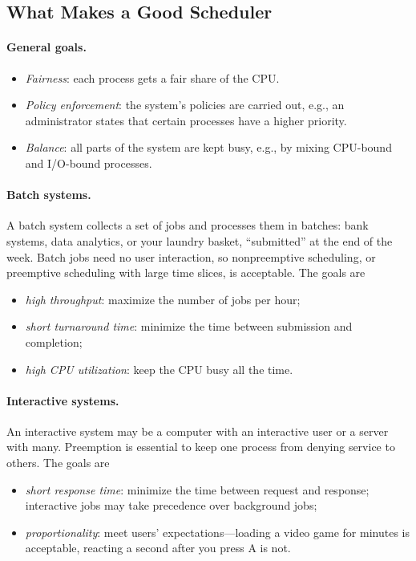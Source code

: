 \subsection{What Makes a Good Scheduler}

\paragraph{General goals.}
\begin{itemize}
  \item \emph{Fairness}: each process gets a fair share of the CPU.
  \item \emph{Policy enforcement}: the system's policies are carried out, e.g., an administrator states that certain processes have a higher priority.
  \item \emph{Balance}: all parts of the system are kept busy, e.g., by mixing CPU-bound and I/O-bound processes.
\end{itemize}

\paragraph{Batch systems.} A batch system collects a set of jobs and processes them in batches: bank systems, data analytics, or your laundry basket, ``submitted'' at the end of the week. Batch jobs need no user interaction, so nonpreemptive scheduling, or preemptive scheduling with large time slices, is acceptable. The goals are
\begin{itemize}
  \item \emph{high throughput}: maximize the number of jobs per hour;
  \item \emph{short turnaround time}: minimize the time between submission and completion;
  \item \emph{high CPU utilization}: keep the CPU busy all the time.
\end{itemize}

\paragraph{Interactive systems.} An interactive system may be a computer with an interactive user or a server with many. Preemption is essential to keep one process from denying service to others. The goals are
\begin{itemize}
  \item \emph{short response time}: minimize the time between request and response; interactive jobs may take precedence over background jobs;
  \item \emph{proportionality}: meet users' expectations---loading a video game for minutes is acceptable, reacting a second after you press A is not.
\end{itemize}

